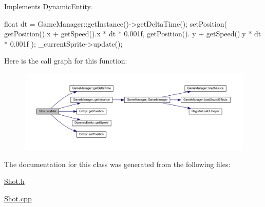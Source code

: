 Implements \hyperlink{class_dynamic_entity_a80ad0626e1c2167efa049c580c0d466c}{DynamicEntity}.


\begin{DoxyCode}
{
        float dt = GameManager::getInstance()->getDeltaTime();
        setPosition( getPosition().x + getSpeed().x * dt * 0.001f, getPosition().
      y + getSpeed().y * dt * 0.001f );
        _currentSprite->update();
}
\end{DoxyCode}


Here is the call graph for this function:
\nopagebreak
\begin{figure}[H]
\begin{center}
\leavevmode
\includegraphics[width=400pt]{de/d74/class_shot_a5073ee7ba59e6f6a8c7702ff7c9ad960_cgraph}
\end{center}
\end{figure}




The documentation for this class was generated from the following files:\begin{DoxyCompactItemize}
\item 
\hyperlink{_shot_8h}{Shot.h}\item 
\hyperlink{_shot_8cpp}{Shot.cpp}\end{DoxyCompactItemize}
